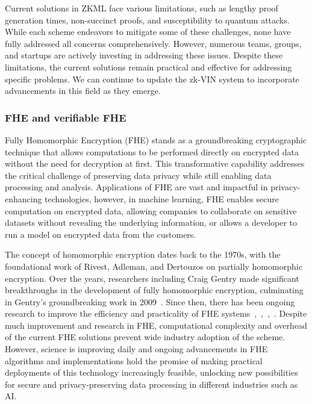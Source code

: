 \documentclass[conference]{IEEEtran}
\begin{document}
Current solutions in ZKML face various limitations, such as lengthy proof generation times, non-succinct proofs, and susceptibility to quantum attacks. While each scheme endeavors to mitigate some of these challenges, none have fully addressed all concerns comprehensively. However, numerous teams, groups, and startups are actively investing in addressing these issues. Despite these limitations, the current solutions remain practical and effective for addressing specific problems. We can continue to update the zk-VIN system to incorporate advancements in this field as they emerge.

\subsubsection{FHE and verifiable FHE}

Fully Homomorphic Encryption (FHE) stands as a groundbreaking cryptographic technique that allows computations to be performed directly on encrypted data without the need for decryption at first. This transformative capability addresses the critical challenge of preserving data privacy while still enabling data processing and analysis. Applications of FHE are vast and impactful in privacy-enhancing technologies, however, in machine learning, FHE enables secure computation on encrypted data, allowing companies to collaborate on sensitive datasets without revealing the underlying information, or allows a developer to run a model on encrypted data from the customers.

The concept of homomorphic encryption dates back to the 1970s, with the foundational work of Rivest, Adleman, and Dertouzos on partially homomorphic encryption. Over the years, researchers including Craig Gentry made significant breakthroughs in the development of fully homomorphic encryption, culminating in Gentry’s groundbreaking work in 2009~\cite{Gentry2009FullyHE}. Since then, there has been ongoing research to improve the efficiency and practicality of FHE systems~\cite{Dijk2010FullyHE},~\cite{Brakerski2012LeveledFH},~\cite{Gentry2013HomomorphicEF},~\cite{Cheon2017HomomorphicEF}. Despite much improvement and research in FHE, computational complexity and overhead of the current FHE solutions prevent wide industry adoption of the scheme. However, science is improving daily and ongoing advancements in FHE algorithms and implementations hold the promise of making practical deployments of this technology increasingly feasible, unlocking new possibilities for secure and privacy-preserving data processing in different industries such as AI.
\end{document}
